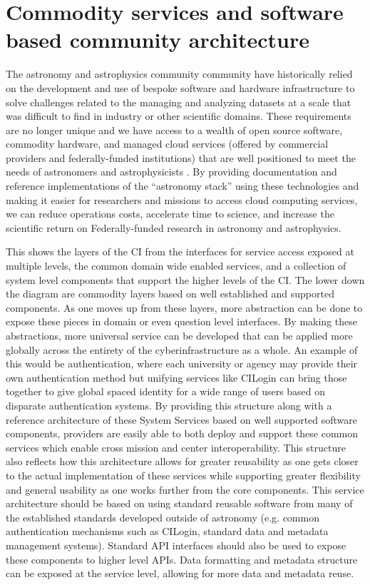 \section{Commodity services and \gls{software} based community architecture} \label{sec:refarc}
The astronomy and astrophysics community community have historically relied on the development and use of bespoke \gls{software} and hardware infrastructure to solve challenges related to the managing and analyzing datasets at a scale that was difficult to find in industry or other scientific domains.
These requirements are no longer unique and we have access to a wealth of open source \gls{software}, commodity hardware, and managed \gls{cloud} services (offered by commercial providers and federally-funded institutions) that are well positioned to meet the needs of astronomers and astrophysicists \cite{2019AAS...23345706M, 2019AAS...23324505B}.
By providing documentation and reference implementations of the “astronomy \gls{stack}” using these technologies and making it easier for researchers and missions to access \gls{cloud} computing services, we can reduce operations costs, accelerate time to science, and increase the scientific return on Federally-funded research in astronomy and astrophysics.


 This shows the
layers of the \gls{CI} from the interfaces for service access exposed
at multiple levels, the common domain wide enabled services, and a collection of system level components that support the
higher levels of the \gls{CI}.
The lower down the diagram are commodity layers based on well established and supported
components. As one moves up from these layers, more abstraction can be done to
expose these pieces in domain or even question level interfaces. By making these
abstractions, more universal service can be developed that can be applied more globally
across the entirety of the \gls{cyberinfrastructure} as a whole.  An example of this would be
authentication, where each university or agency may provide their own authentication method
but unifying services like CILogin can bring those together to give global spaced
identity for a wide range of users based on disparate authentication systems.
By providing this structure along with a reference architecture of these System Services based on
well supported \gls{software} components, providers are easily able to both deploy and support these common services which enable
cross mission and center \gls{interoperability}. This structure also reflects how this architecture allows for greater reusability as one gets closer to the actual implementation of these
services while supporting greater flexibility and general usability as one works further from the core components.
This service architecture should be based on using standard reusable \gls{software} from many of the established standards developed outside of astronomy (e.g. common authentication mechanisms such as CILogin, standard data and \gls{metadata} management systems).  Standard \gls{API} interfaces should also be used to expose these components to higher level \gls{API}s. Data
formatting and \gls{metadata} structure can be exposed at the service level, allowing for
more data and \gls{metadata} reuse.


